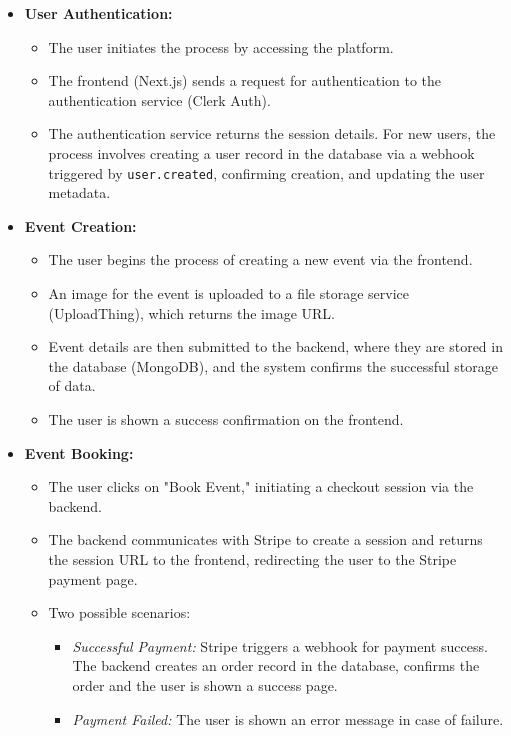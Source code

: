 \begin{itemize}
    \item \textbf{User Authentication:}
    \begin{itemize}
        \item The user initiates the process by accessing the platform.
        \item The frontend (Next.js) sends a request for authentication to the authentication service (Clerk Auth).
        \item The authentication service returns the session details. For new users, the process involves creating a user record in the database via a webhook triggered by \texttt{user.created}, confirming creation, and updating the user metadata.
    \end{itemize}

    \item \textbf{Event Creation:}
    \begin{itemize}
        \item The user begins the process of creating a new event via the frontend.
        \item An image for the event is uploaded to a file storage service (UploadThing), which returns the image URL.
        \item Event details are then submitted to the backend, where they are stored in the database (MongoDB), and the system confirms the successful storage of data.
        \item The user is shown a success confirmation on the frontend.
    \end{itemize}

    \item \textbf{Event Booking:}
    \begin{itemize}
        \item The user clicks on "Book Event," initiating a checkout session via the backend.
        \item The backend communicates with Stripe to create a session and returns the session URL to the frontend, redirecting the user to the Stripe payment page.
        \item Two possible scenarios:
        \begin{itemize}
            \item \textit{Successful Payment:} Stripe triggers a webhook for payment success. The backend creates an order record in the database, confirms the order and the user is shown a success page.
            \item \textit{Payment Failed:} The user is shown an error message in case of failure.
        \end{itemize}
    \end{itemize}


\end{itemize}
